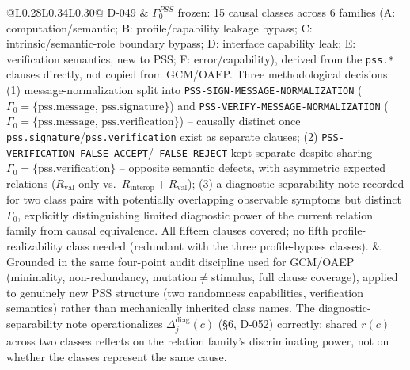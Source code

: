 \documentclass[11pt,a4paper]{article}
\begin{document}
\begin{longtable}{@{}L{0.28\textwidth}L{0.34\textwidth}L{0.30\textwidth}@{}}
D-049 & $\Gamma_0^{PSS}$ frozen: 15 causal classes across 6 families (A: computation/semantic; B: profile/capability leakage bypass; C: intrinsic/semantic-role boundary bypass; D: interface capability leak; E: verification semantics, new to PSS; F: error/capability), derived from the \texttt{pss.*} clauses directly, not copied from GCM/OAEP. Three methodological decisions: (1) message-normalization split into \texttt{PSS-SIGN-MESSAGE-NORMALIZATION} ($\Gamma_0=\{\text{pss.message, pss.signature}\}$) and \texttt{PSS-VERIFY-MESSAGE-NORMALIZATION} ($\Gamma_0=\{\text{pss.message, pss.verification}\}$) -- causally distinct once \texttt{pss.signature}/\texttt{pss.verification} exist as separate clauses; (2) \texttt{PSS-VERIFICATION-FALSE-ACCEPT}/\texttt{-FALSE-REJECT} kept separate despite sharing $\Gamma_0=\{\text{pss.verification}\}$ -- opposite semantic defects, with asymmetric expected relations ($R_{\text{val}}$ only vs.\ $R_{\text{interop}}+R_{\text{val}}$); (3) a diagnostic-separability note recorded for two class pairs with potentially overlapping observable symptoms but distinct $\Gamma_0$, explicitly distinguishing limited diagnostic power of the current relation family from causal equivalence. All fifteen clauses covered; no fifth profile-realizability class needed (redundant with the three profile-bypass classes). & Grounded in the same four-point audit discipline used for GCM/OAEP (minimality, non-redundancy, mutation$\neq$stimulus, full clause coverage), applied to genuinely new PSS structure (two randomness capabilities, verification semantics) rather than mechanically inherited class names. The diagnostic-separability note operationalizes $\Delta_j^{\text{diag}}(c)$ (\S6, D-052) correctly: shared $r(c)$ across two classes reflects on the relation family's discriminating power, not on whether the classes represent the same cause.\\

\end{longtable}
\end{document}
